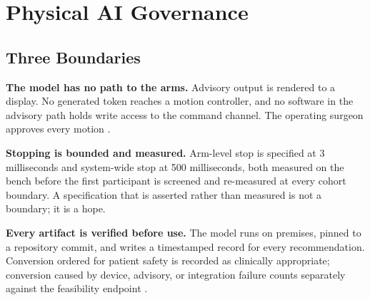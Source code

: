 \section{Physical AI Governance}

\subsection{Three Boundaries}

\textbf{The model has no path to the arms.} Advisory output is rendered to a
display. No generated token reaches a motion controller, and no software in the
advisory path holds write access to the command channel. The operating surgeon
approves every motion \cite{onpremwhippl}.

\textbf{Stopping is bounded and measured.} Arm-level stop is specified at 3
milliseconds and system-wide stop at 500 milliseconds, both measured on the
bench before the first participant is screened and re-measured at every cohort
boundary. A specification that is asserted rather than measured is not a
boundary; it is a hope.

\textbf{Every artifact is verified before use.} The model runs on premises,
pinned to a repository commit, and writes a timestamped record for every
recommendation. Conversion ordered for patient safety is recorded as clinically
appropriate; conversion caused by device, advisory, or integration failure
counts separately against the feasibility endpoint \cite{phase1ind}.

